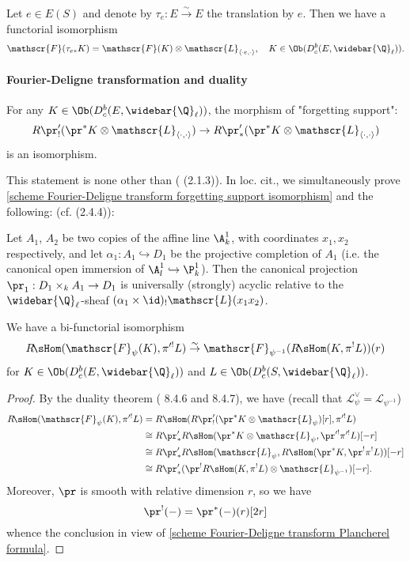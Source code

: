 \begin{proposition}\label{scheme Fourier-Deligne transform of translation sheaf char}
Let $e\in E(S)$ and denote by $\tau_e:E\stackrel{\sim}{\to}E$ the translation by $e$. Then we have a functorial isomorphism
\[\mathscr{F}(\tau_{e*}K)=\mathscr{F}(K)\otimes\mathscr{L}_{\langle \cdot e,\cdot\rangle},\quad K\in\Ob(D^b_c(E,\widebar{\Q}_\ell)).\]
\end{proposition}

\paragraph{Fourier-Deligne transformation and duality}
\begin{theorem}\label{scheme Fourier-Deligne transform forgetting support isomorphism}
For any $K\in\Ob(D^b_c(E,\widebar{\Q}_\ell))$, the morphism of "forgetting support":
\[R\pr'_!(\pr^*K\otimes\mathscr{L}_{\langle\cdot,\cdot\rangle})\to R\pr'_*(\pr^*K\otimes\mathscr{L}_{\langle\cdot,\cdot\rangle})\]
is an isomorphism.
\end{theorem}

This statement is none other than (\cite{Ka-La1985} (2.1.3)). In loc. cit., we simultaneously prove \cref{scheme Fourier-Deligne transform forgetting support isomorphism} and the following: (cf. \cite{Ka-La1985} (2.4.4)):
\begin{theorem}
Let $A_1$, $A_2$ be two copies of the affine line $\A^1_k$, with coordinates $x_1,x_2$ respectively, and let $\alpha_1:A_1\hookrightarrow D_1$ be the projective completion of $A_1$ (i.e. the canonical open immersion of $\A_l^1\hookrightarrow\P_k^1$). Then the canonical projection $\pr_1:D_1\times_kA_1\to D_1$ is universally (strongly) acyclic relative to the $\widebar{\Q}_\ell$-sheaf $(\alpha_1\times\id)_!\mathscr{L}(x_1x_2)$.
\end{theorem}

\begin{theorem}\label{scheme Fourier-Deligne transform duality theorem}
We have a bi-functorial isomorphism
\[R\!\sHom(\mathscr{F}_\psi(K),\pi'^!L)\stackrel{\sim}{\to} \mathscr{F}_{\psi^{-1}}(R\!\sHom(K,\pi^!L))(r)\]
for $K\in\Ob(D^b_c(E,\widebar{\Q}_\ell))$ and $L\in\Ob(D^b_c(S,\widebar{\Q}_\ell))$.
\end{theorem}
\begin{proof}
By the duality theorem (\cite{LeiFu} 8.4.6 and 8.4.7), we have (recall that $\mathscr{L}_\psi^\vee=\mathscr{L}_{\psi^{-1}}$)
\begin{align*}
R\!\sHom(\mathscr{F}_\psi(K),\pi'^!L)&=R\sHom(R\pr'_!(\pr^*K\otimes\mathscr{L}_\psi)[r],\pi'^!L)\\
&\cong R\pr'_*R\sHom(\pr^*K\otimes \mathscr{L}_\psi,\pr'^!\pi'^!L)[-r]\\
&\cong R\pr'_*R\sHom(\mathscr{L}_\psi,R\sHom(\pr^*K,\pr^!\pi^!L))[-r]\\
&\cong R\pr'_*(\pr^!R\sHom(K,\pi^!L)\otimes\mathscr{L}_{\psi^{-1}})[-r].
\end{align*}
Moreover, $\pr$ is smooth with relative dimension $r$, so we have
\[\pr^!(-)=\pr^*(-)(r)[2r]\]
whence the conclusion in view of \cref{scheme Fourier-Deligne transform Plancherel formula}.
\end{proof}

